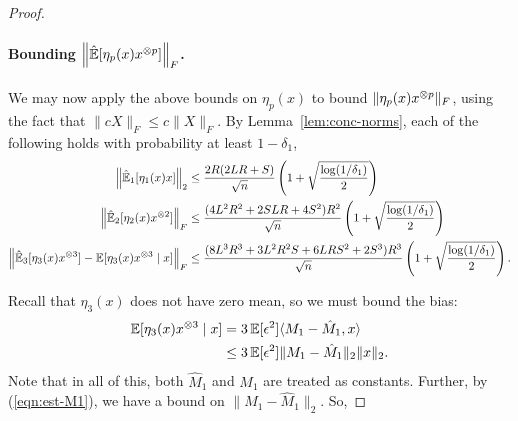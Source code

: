 \documentclass[tablecaption=bottom]{jmlr}
\newcommand\refeqn[1]{(\ref{eqn:#1})}
\newcommand\reflem[1]{Lemma~\ref{lem:#1}}
\begin{document}
\begin{proof}
\paragraph{Bounding $\left\| \hat{\operatorname{\mathbb{E}}}[\eta_p(x)x^{\otimes p}] \right\|_F$.}
We may now apply the above bounds on $\eta_p(x)$ to bound $\|\eta_p(x) x^{\otimes p}\|_F$, using the fact that $\|c X\|_F \le c\|X\|_F$.
By \reflem{conc-norms}, each of the following holds with probability at least $1-\delta_1$,
\begin{align}
    \left\|\hat{\operatorname{\mathbb{E}}}_1[\eta_1(x) x] \right\|_2
    &\le \frac{2R (2LR + S)}{\sqrt{n}} \left( 1 + \sqrt{\frac{\log(1/\delta_1)}{2}} \right) \label{eqn:est-M1} \\
  \left\|\hat{\operatorname{\mathbb{E}}}_2[\eta_2(x) x^{\otimes 2}] \right\|_F
      &\le \frac{(4L^2 R^2 + 2 S L R + 4S^2)R^2}{\sqrt{n}} \left( 1 + \sqrt{\frac{\log(1/\delta_1)}{2}} \right) \nonumber \\
  \left\|\hat{\operatorname{\mathbb{E}}}_3[\eta_3(x) x^{\otimes 3}] - \operatorname{\mathbb{E}}[\eta_3(x) x^{\otimes 3} \mid x] \right\|_F
      &\le \frac{(8L^3 R^3 + 3 L^2 R^2 S + 6 L R S^2 + 2S^3) R^3}{\sqrt{n}} \left( 1 + \sqrt{\frac{\log(1/\delta_1)}{2}} \right) \nonumber.
\end{align}

Recall that $\eta_3(x)$ does not have zero mean, so we must bound the bias:
\begin{align*}
  \operatorname{\mathbb{E}}[\eta_3(x) x^{\otimes 3} \mid x] &= 3 \operatorname{\mathbb{E}}[\epsilon^2] \langle M_1 - \hat M_1, x \rangle \\
    &\le 3 \operatorname{\mathbb{E}}[\epsilon^2] \|M_1 - \hat M_1\|_2 \|x\|_2.
\end{align*}
Note that in all of this, both $\hat M_1$ and $M_1$ are treated as
constants. Further, by \refeqn{est-M1}, we have a bound on $\|M_1 - \hat
M_1\|_2$. So,


\end{proof}
\end{document}
